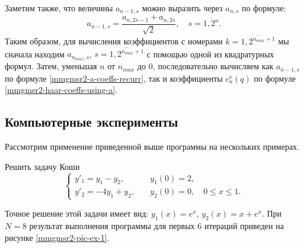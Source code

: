 Заметим также, что величины $a_{n-1,s}$ можно выразить через $a_{n,s}$ по формуле:
\begin{equation}\label{mmgmsr2-a-coeffs-recurr}
a_{n-1,s}=\frac{a_{n,2s-1}+a_{n,2s}}{\sqrt{2}},
\quad s = \overline{1,2^{n}}.
\end{equation}
Таким образом, для вычисления коэффициентов с номерами $k=\overline{1,2^{n_{max}+1}}$ мы сначала находим $a_{n_{max},s}$, $s=\overline{1,2^{n_{max}+1}}$ с помощью одной из квадратурных формул. Затем, уменьшая $n$ от $n_{max}$ до $0$, последовательно вычисляем как $a_{n-1,s}$ по формуле \eqref{mmgmsr2-a-coeffs-recurr}, так и коэффициенты $c_n^s(q)$ по формуле \eqref{mmgmsr2-haar-coeffs-using-a}.




\subsection{Компьютерные эксперименты}
Рассмотрим применение приведенной выше программы на нескольких примерах.
\begin{example}\label{mmgmsr2-ex-1}
	Решить задачу Коши
	\begin{equation*}
	\begin{cases}
	y'_1= y_1 - y_2, &\quad y_1(0)=2,\\
	y'_2= -4y_1 + y_2, &\quad y_2(0) = 0, \quad 0 \le x \le 1.
	\end{cases}
	\end{equation*}
\end{example}
Точное решение этой задачи имеет вид: $y_1(x)=e^x$, $y_2(x)=x+e^x$.
При $N=8$ результат выполнения программы для первых 6 итераций приведен на рисунке \ref{mmgmsr2-pic-ex-1}.

